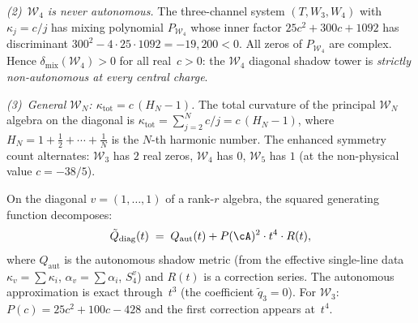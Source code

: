 \begin{example}
\emph{(2)~$\mathcal{W}_4$ is never autonomous.}
The three-channel system
$(T, W_3, W_4)$ with $\kappa_j = c/j$
has mixing polynomial $P_{\mathcal{W}_4}$
whose inner factor $25c^2 + 300c + 1092$
has discriminant $300^2 - 4 \cdot 25 \cdot 1092 = -19{,}200 < 0$.
All zeros of $P_{\mathcal{W}_4}$ are complex.
Hence $\delta_{\mathrm{mix}}(\mathcal{W}_4) > 0$ for
all real~$c > 0$: the $\mathcal{W}_4$ diagonal shadow
tower is \emph{strictly non-autonomous at every central
charge}.

\emph{(3)~General $\mathcal{W}_N$: $\kappa_{\mathrm{tot}}
= c\,(H_N - 1)$.}
The total curvature of the principal $\mathcal{W}_N$ algebra
on the diagonal is $\kappa_{\mathrm{tot}} =
\sum_{j=2}^{N} c/j = c\,(H_N - 1)$, where
$H_N = 1 + \frac{1}{2} + \dotsb + \frac{1}{N}$ is the
$N$-th harmonic number.  The enhanced symmetry count
alternates: $\mathcal{W}_3$ has $2$ real zeros,
$\mathcal{W}_4$ has $0$, $\mathcal{W}_5$ has $1$
(at the non-physical value $c = -38/5$).
\end{example}

\begin{remark}
\label{rem:diagonal-shadow-structure}
On the diagonal $v = (1,\dotsc,1)$ of a rank-$r$ algebra, the squared generating function decomposes:
\[
  \tilde{Q}_{\mathrm{diag}}(t)
  \;=\;
  Q_{\mathrm{aut}}(t) + P(\cA)^2 \cdot t^4 \cdot R(t),
\]
where $Q_{\mathrm{aut}}$ is the autonomous shadow metric (from the effective single-line data $\kappa_v = \sum\kappa_i$, $\alpha_v = \sum \alpha_i$, $S_4^v$) and $R(t)$ is a correction series.  The autonomous approximation is exact through~$t^3$ (the coefficient $\tilde{q}_3 = 0$).  For $\mathcal{W}_3$: $P(c) = 25c^2 + 100c - 428$ and the first correction appears at~$t^4$.
\end{remark}


